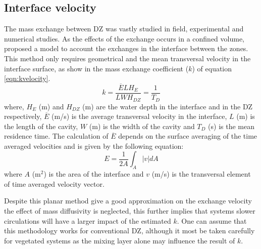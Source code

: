 \documentclass[../main.tex]{subfiles}
\begin{document}
\subsection{Interface velocity}
The mass exchange between DZ was vastly studied in field, experimental and numerical studies. As the effects of the exchange occurs in a confined volume, \textcite{weitbrecht2001} proposed a model to account the exchanges in the interface between the zones. This method only requires geometrical and the mean transversal velocity in the interface surface, as show in the mass exchange coefficient ($k$) of equation \ref{eqn:kvelocity}.
\begin{equation}
k=\frac{\overline{E}LH_E}{L WH_{DZ}}=\frac{1}{T_D}
\label{eqn:kvelocity}
\end{equation}
where, $H_E$ (m) and $H_{DZ}$ (m) are the water depth in the interface and in the DZ respectively, $\overline{E}$ (m/s) is the average transversal velocity in the interface, $L$ (m) is the length of the cavity, $W$ (m) is the width of the cavity and $T_D$ (s) is the mean residence time. The calculation of $\overline{E}$ depends on the surface averaging of the time averaged velocities and is given by the following equation:
\begin{equation}
E = \frac{1}{2A}\int_{A}^{}\left | v \right |dA
\label{eqn:exchangeVel}
 \end{equation}
 where $A$ (m$^2$) is the area of the interface and $v$ (m/s) is the transversal element of time averaged velocity vector.

Despite this planar method give a good approximation on the exchange velocity the effect of mass diffusivity is neglected, this further implies that systems slower circulations will have a larger impact of the estimated $k$. One can assume that this methodology works for conventional DZ, although it most be taken carefully for vegetated systems as the mixing layer alone may influence the result of $k$.
\end{document}
